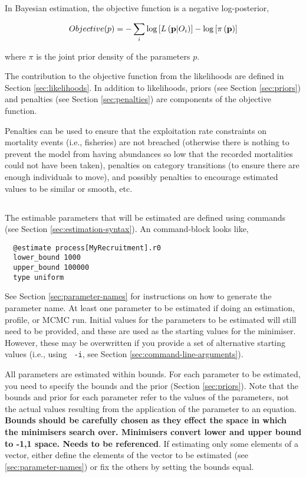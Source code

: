 In Bayesian estimation, the objective function is a negative log-posterior,

\begin{equation}
Objective(p)= - \sum\limits_i {\log \left[ {L\left( {{\bf{p}}|O_i } \right)} \right]}  - \log \left[ {\pi \left( {\bf{p}} \right)} \right]
\end{equation}

where $\pi$ is the joint prior density of the parameters $p$.

The contribution to the objective function from the likelihoods are defined in Section \ref{sec:likelihoods}. In addition to likelihoods, priors (see Section \ref{sec:priors}) and penalties (see Section \ref{sec:penalties}) are components of the objective function. 

Penalties can be used to ensure that the exploitation rate constraints on mortality events (i.e., fisheries) are not breached (otherwise there is nothing to prevent the model from having abundances so low that the recorded mortalities could not have been taken), penalties on category transitions (to ensure there are enough individuals to move), and possibly penalties to encourage estimated values to be similar or smooth, etc.

\subsection{\label{sec:estimate-free-parameters}}
The estimable parameters that will be estimated are defined using  commands (see Section \ref{sec:estimation-syntax}). An  command-block looks like,

{\small{\begin{verbatim}
  @estimate process[MyRecruitment].r0
  lower_bound 1000
  upper_bound 100000
  type uniform
\end{verbatim}}}

See Section \ref{sec:parameter-names} for instructions on how to generate the parameter name. At least one parameter to be estimated if doing an estimation, profile, or MCMC run. Initial values for the parameters to be estimated will still need to be provided, and these are used as the starting values for the minimiser. However, these may be overwritten if you provide a set of alternative starting values (i.e., using  \texttt{\cname\ -i}, see Section \ref{sec:command-line-arguments}).

All parameters are estimated within bounds. For each parameter to be estimated, you need to specify the bounds and the prior (Section \ref{sec:priors}). Note that the bounds and prior for each parameter refer to the values of the parameters, not the actual values resulting from the application of the parameter to an equation. \textbf{Bounds should be carefully chosen as they effect the space in which the minimisers search over. Minimisers convert lower and upper bound to -1,1 space. Needs to be referenced}. If estimating only some elements of a vector, either define the elements of the vector to be estimated (see \ref{sec:parameter-names}) or fix the others by setting the bounds equal.

